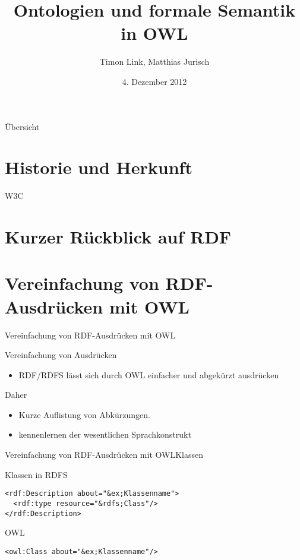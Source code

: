 \documentclass{beamer}
\title[OWL]{Ontologien und formale Semantik in OWL}
\author{Timon Link, Matthias Jurisch}
\date{4. Dezember 2012}
\begin{document}
\begin{frame}
\titlepage
\end{frame}

\begin{frame}{Übersicht}
\tableofcontents
\end{frame}

\section{Historie und Herkunft}
\begin{frame}{W3C}
\end{frame}

\section{Kurzer Rückblick auf RDF}


\section{Vereinfachung von RDF-Ausdrücken mit OWL}
\begin{frame}[fragile]{Vereinfachung von RDF-Ausdrücken mit
OWL}
\begin{block}{Vereinfachung von Ausdrücken}
\begin{itemize}
\item RDF/RDFS lässt sich durch OWL einfacher und abgekürzt ausdrücken
\end{itemize}
\end{block}

\begin{block}{Daher}
\begin{itemize}
\item Kurze Auflistung von Abkürzungen.
\item kennenlernen der wesentlichen Sprachkonstrukt
\end{itemize}
\end{block}


\end{frame}
\begin{frame}[fragile]{Vereinfachung von RDF-Ausdrücken mit
OWL}{Klassen}
\begin{block}{Klassen in RDFS}
\begin{lstlisting}[lang="xml"]
<rdf:Description about="&ex;Klassenname">
  <rdf:type resource="&rdfs;Class"/>
</rdf:Description>
\end{lstlisting}
\end{block}
\begin{block}{OWL}
\begin{lstlisting}[lang="xml"]
<owl:Class about="&ex;Klassenname"/>
\end{lstlisting}
\end{block}

\end{frame}
\end{document}

